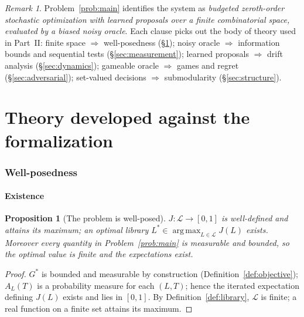 \documentclass[11pt]{article}
\theoremstyle{plain}
\newtheorem{proposition}[theorem]{Proposition}
\theoremstyle{definition}
\theoremstyle{remark}
\newtheorem{remark}[theorem]{Remark}
\newcommand{\cL}{\mathcal{L}}
\DeclareMathOperator*{\argmax}{arg\,max}
\begin{document}
\begin{remark}
Problem~\ref{prob:main} identifies the system as \emph{budgeted zeroth-order
stochastic optimization with learned proposals over a finite combinatorial
space, evaluated by a biased noisy oracle}. Each clause picks out the body of
theory used in Part~II: finite space $\Rightarrow$ well-posedness
(\S\ref{sec:wellposed}); noisy oracle $\Rightarrow$ information bounds and
sequential tests (\S\ref{sec:measurement}); learned proposals $\Rightarrow$
drift analysis (\S\ref{sec:dynamics}); gameable oracle $\Rightarrow$ games and
regret (\S\ref{sec:adversarial}); set-valued decisions $\Rightarrow$
submodularity (\S\ref{sec:structure}).
\end{remark}

\part{Theory developed against the formalization}

\section{Well-posedness}\label{sec:wellposed}

\subsection{Existence}

\begin{proposition}[The problem is well-posed]\label{prop:exists}
$J : \cL \to [0,1]$ is well-defined and attains its maximum; an optimal
library $L^\ast \in \argmax_{L \in \cL} J(L)$ exists. Moreover every
quantity in Problem~\ref{prob:main} is measurable and bounded, so the
optimal value is finite and the expectations exist.
\end{proposition}

\begin{proof}
$G^\ast$ is bounded and measurable by construction
(Definition~\ref{def:objective}); $A_L(T)$ is a probability measure for each
$(L,T)$; hence the iterated expectation defining $J(L)$ exists and lies in
$[0,1]$. By Definition~\ref{def:library}, $\cL$ is finite; a real function on
a finite set attains its maximum.
\end{proof}
\end{document}
